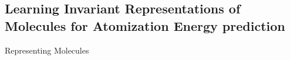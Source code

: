 \documentclass[10pt,journal,a4paper]{IEEEtran}
\begin{document}


%
%


%


\subsection{Learning Invariant Representations of Molecules for Atomization Energy prediction}
Representing Molecules
\end{document}
